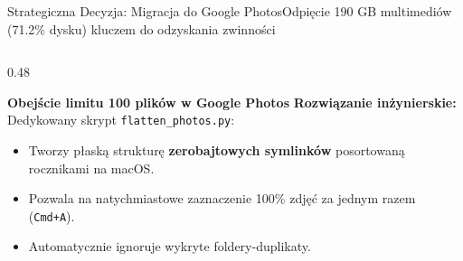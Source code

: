 \documentclass[aspectratio=169, 10pt]{beamer}
\begin{document}
\begin{frame}{Strategiczna Decyzja: Migracja do Google Photos}{Odpięcie 190 GB multimediów (71.2\% dysku) kluczem do odzyskania zwinności}
\begin{columns}[T]
\begin{column}{0.48\textwidth}
\begin{block}{\textbf{Obejście limitu 100 plików w Google Photos}}
        \vspace{0.2cm}
        \textbf{Rozwiązanie inżynierskie:} Dedykowany skrypt \texttt{flatten\_photos.py}:
        \begin{itemize}\scriptsize
          \item Tworzy płaską strukturę \textbf{zerobajtowych symlinków} posortowaną rocznikami na macOS.
          \item Pozwala na natychmiastowe zaznaczenie 100\% zdjęć za jednym razem (\texttt{Cmd+A}).
          \item Automatycznie ignoruje wykryte foldery-duplikaty.
        \end{itemize}
      \end{block}
    \end{column}
  \end{columns}
\end{frame}
\end{document}
